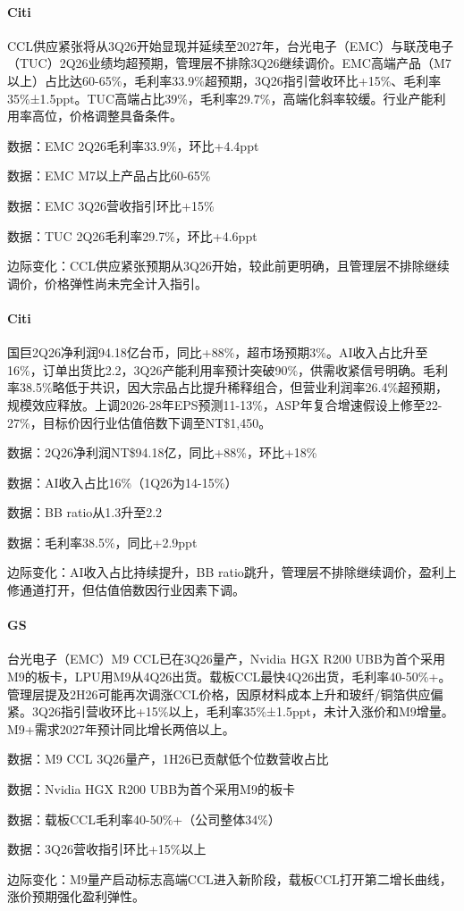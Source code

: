 \documentclass[11pt]{ctexart}
\begin{document}
\paragraph{Citi} CCL供应紧张将从3Q26开始显现并延续至2027年，台光电子（EMC）与联茂电子（TUC）2Q26业绩均超预期，管理层不排除3Q26继续调价。EMC高端产品（M7以上）占比达60-65\%，毛利率33.9\%超预期，3Q26指引营收环比+15\%、毛利率35\%±1.5ppt。TUC高端占比39\%，毛利率29.7\%，高端化斜率较缓。行业产能利用率高位，价格调整具备条件。
{\small\color{refgray}数据：EMC 2Q26毛利率33.9\%，环比+4.4ppt\par}
{\small\color{refgray}数据：EMC M7以上产品占比60-65\%\par}
{\small\color{refgray}数据：EMC 3Q26营收指引环比+15\%\par}
{\small\color{refgray}数据：TUC 2Q26毛利率29.7\%，环比+4.6ppt\par}
{\small\color{refgray}边际变化：CCL供应紧张预期从3Q26开始，较此前更明确，且管理层不排除继续调价，价格弹性尚未完全计入指引。\par}
\paragraph{Citi} 国巨2Q26净利润94.18亿台币，同比+88\%，超市场预期3\%。AI收入占比升至16\%，订单出货比2.2，3Q26产能利用率预计突破90\%，供需收紧信号明确。毛利率38.5\%略低于共识，因大宗品占比提升稀释组合，但营业利润率26.4\%超预期，规模效应释放。上调2026-28年EPS预测11-13\%，ASP年复合增速假设上修至22-27\%，目标价因行业估值倍数下调至NT\$1,450。
{\small\color{refgray}数据：2Q26净利润NT\$94.18亿，同比+88\%，环比+18\%\par}
{\small\color{refgray}数据：AI收入占比16\%（1Q26为14-15\%）\par}
{\small\color{refgray}数据：BB ratio从1.3升至2.2\par}
{\small\color{refgray}数据：毛利率38.5\%，同比+2.9ppt\par}
{\small\color{refgray}边际变化：AI收入占比持续提升，BB ratio跳升，管理层不排除继续调价，盈利上修通道打开，但估值倍数因行业因素下调。\par}
\paragraph{GS} 台光电子（EMC）M9 CCL已在3Q26量产，Nvidia HGX R200 UBB为首个采用M9的板卡，LPU用M9从4Q26出货。载板CCL最快4Q26出货，毛利率40-50\%+。管理层提及2H26可能再次调涨CCL价格，因原材料成本上升和玻纤/铜箔供应偏紧。3Q26指引营收环比+15\%以上，毛利率35\%±1.5ppt，未计入涨价和M9增量。M9+需求2027年预计同比增长两倍以上。
{\small\color{refgray}数据：M9 CCL 3Q26量产，1H26已贡献低个位数营收占比\par}
{\small\color{refgray}数据：Nvidia HGX R200 UBB为首个采用M9的板卡\par}
{\small\color{refgray}数据：载板CCL毛利率40-50\%+（公司整体34\%）\par}
{\small\color{refgray}数据：3Q26营收指引环比+15\%以上\par}
{\small\color{refgray}边际变化：M9量产启动标志高端CCL进入新阶段，载板CCL打开第二增长曲线，涨价预期强化盈利弹性。\par}
\end{document}
